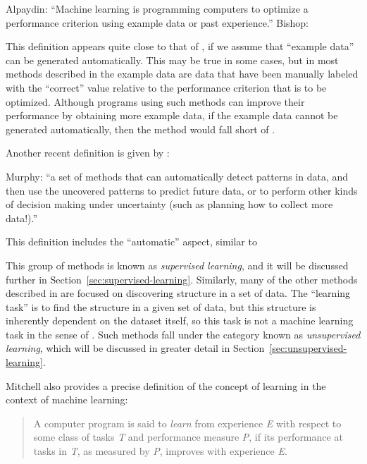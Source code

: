 Alpaydin: ``Machine learning is programming computers to optimize a performance criterion using example data or past experience.''
Bishop: 


This definition appears quite close to that of \cite{Mitchell1990}, if we assume that ``example data'' can be generated automatically. This may be true in some cases, but in most methods described in \cite{alpaydin2014introduction} the example data are data that have been manually labeled with the ``correct'' value relative to the performance criterion that is to be optimized. Although programs using such methods can improve their performance by obtaining more example data, if the example data cannot be generated automatically, then the method would fall short of \cite{Mitchell1990}.

Another recent definition is given by \cite{Murphy2012}:

Murphy: ``a set of methods that can automatically detect patterns in data, and then use the uncovered patterns to predict future data, or to perform other kinds of decision making under uncertainty (such as planning how to collect more data!).''

This definition includes the ``automatic'' aspect, similar to \cite{Mitchell1990}

This group of methods is known as \emph{supervised learning}, and it will be discussed further in Section~\ref{sec:supervised-learning}. Similarly, many of the other methods described in \cite{alpaydin2014introduction} are focused on discovering structure in a set of data. The ``learning task'' is to find the structure in a given set of data, but this structure is inherently dependent on the dataset itself, so this task is not a machine learning task in the sense of \cite{Mitchell1990}. Such methods fall under the category known as \emph{unsupervised learning}, which will be discussed in greater detail in Section~\ref{sec:unsupervised-learning}.

Mitchell also provides a precise definition of the concept of learning in the context of machine learning:
%
\begin{quote}
A computer program is said to \emph{learn} from experience \emph{E} with respect to some class of tasks \emph{T} and performance measure \emph{P}, if its performance at tasks in \emph{T}, as measured by \emph{P}, improves with experience \emph{E}.
\end{quote}
%
%
%


